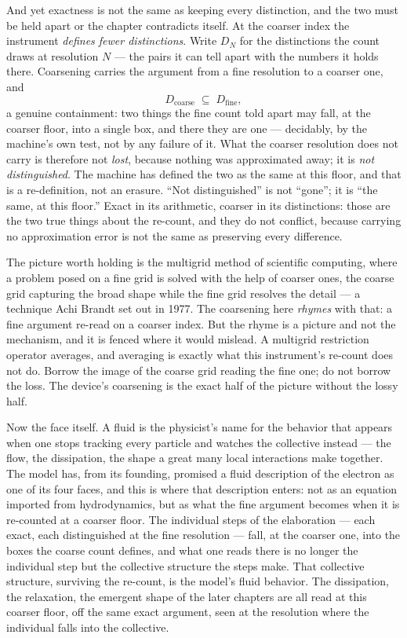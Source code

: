 And yet exactness is not the same as keeping every distinction, and the two must
be held apart or the chapter contradicts itself. At the coarser index the
instrument \emph{defines fewer distinctions}. Write $D_{N}$ for the distinctions
the count draws at resolution $N$ --- the pairs it can tell apart with the numbers
it holds there. Coarsening carries the argument from a fine resolution to a
coarser one, and
\[
  D_{\text{coarse}} \;\subseteq\; D_{\text{fine}},
\]
a genuine containment: two things the fine count told apart may fall, at the
coarser floor, into a single box, and there they are one --- decidably, by the
machine's own test, not by any failure of it. What the coarser resolution does
not carry is therefore not \emph{lost}, because nothing was approximated away; it
is \emph{not distinguished}. The machine has defined the two as the same at this
floor, and that is a re-definition, not an erasure. ``Not distinguished'' is not
``gone''; it is ``the same, at this floor.'' Exact in its arithmetic, coarser in
its distinctions: those are the two true things about the re-count, and they do
not conflict, because carrying no approximation error is not the same as
preserving every difference.

\begin{intuition}
The picture worth holding is the multigrid method of scientific computing, where
a problem posed on a fine grid is solved with the help of coarser ones, the coarse
grid capturing the broad shape while the fine grid resolves the detail --- a
technique Achi Brandt set out in 1977. The coarsening here \emph{rhymes} with
that: a fine argument re-read on a coarser index. But the rhyme is a picture and
not the mechanism, and it is fenced where it would mislead. A multigrid
restriction operator averages, and averaging is exactly what this instrument's
re-count does not do. Borrow the image of the coarse grid reading the fine one;
do not borrow the loss. The device's coarsening is the exact half of the picture
without the lossy half.
\end{intuition}

Now the face itself. A fluid is the physicist's name for the behavior that
appears when one stops tracking every particle and watches the collective
instead --- the flow, the dissipation, the shape a great many local interactions
make together.
The model has, from its founding, promised a fluid description of the electron as
one of its four faces, and this is where that description enters: not as an
equation imported from hydrodynamics, but as what the fine argument becomes when
it is re-counted at a coarser floor. The individual steps of the elaboration ---
each exact, each distinguished at the fine resolution --- fall, at the coarser
one, into the boxes the coarse count defines, and what one reads there is no
longer the individual step but the collective structure the steps make. That
collective structure, surviving the re-count, is the model's fluid behavior. The
dissipation, the relaxation, the emergent shape of the later chapters are all
read at this coarser floor, off the same exact argument, seen at the resolution
where the individual falls into the collective.


